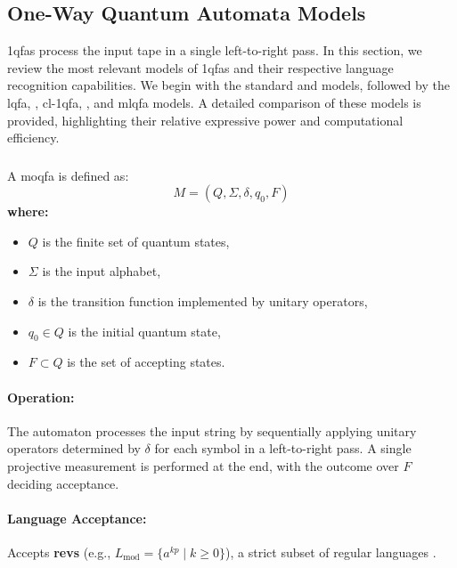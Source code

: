 \subsection{One-Way Quantum Automata Models}
\label{sec:one-way-qfas}

\glspl{1qfa} process the input tape in a single left-to-right pass. In this section, we review the most relevant models of \glspl{1qfa} and their respective language recognition capabilities. We begin with the standard  and  models, followed by the \gls{lqfa}, , \gls{cl-1qfa}, , and \gls{mlqfa} models. A detailed comparison of these models is provided, highlighting their relative expressive power and computational efficiency.

\subsubsection{}
\label{subsec:moqfa}
\begin{definition}
A \gls{moqfa} is defined as:
\[
M = (Q, \Sigma, \delta, q_0, F)
\]
\textbf{where:}
\begin{itemize}
    \item \( Q \) is the finite set of quantum states,
    \item \( \Sigma \) is the input alphabet,
    \item \( \delta \) is the transition function implemented by unitary operators,
    \item \( q_0 \in Q \) is the initial quantum state,
    \item \( F \subset Q \) is the set of accepting states.
\end{itemize}
\end{definition}

\paragraph{Operation:}  
The automaton processes the input string by sequentially applying unitary operators determined by \( \delta \) for each symbol in a left-to-right pass. A single projective measurement is performed at the end, with the outcome over \( F \) deciding acceptance.

\paragraph{Language Acceptance:}  
Accepts \textbf{\glspl{rev}} (e.g., \( L_{\text{mod}} = \{a^{kp} \mid k \geq 0\} \)), a strict subset of regular languages \cite{kondacs1997power}.
